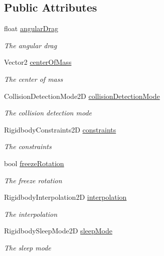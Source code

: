 \subsection*{Public Attributes}
\begin{DoxyCompactItemize}
\item 
float \hyperlink{class_serialize_rigid_body2_d_1_1_rigid_body_info_a3f9bedb62fcbba4aaf6b9cfa2e3b0312}{angular\+Drag}
\begin{DoxyCompactList}\small\item\em The angular drag \end{DoxyCompactList}\item 
Vector2 \hyperlink{class_serialize_rigid_body2_d_1_1_rigid_body_info_a2d7ee56387ef715efaea212b3ebafdd2}{center\+Of\+Mass}
\begin{DoxyCompactList}\small\item\em The center of mass \end{DoxyCompactList}\item 
Collision\+Detection\+Mode2D \hyperlink{class_serialize_rigid_body2_d_1_1_rigid_body_info_a7e7fd47e14d4ba88984b267519a0edd3}{collision\+Detection\+Mode}
\begin{DoxyCompactList}\small\item\em The collision detection mode \end{DoxyCompactList}\item 
Rigidbody\+Constraints2D \hyperlink{class_serialize_rigid_body2_d_1_1_rigid_body_info_a6f74e2ed03d785da45b9fd297ab0bf3b}{constraints}
\begin{DoxyCompactList}\small\item\em The constraints \end{DoxyCompactList}\item 
bool \hyperlink{class_serialize_rigid_body2_d_1_1_rigid_body_info_abf143205ce2eae0445bc2450f0335949}{freeze\+Rotation}
\begin{DoxyCompactList}\small\item\em The freeze rotation \end{DoxyCompactList}\item 
Rigidbody\+Interpolation2D \hyperlink{class_serialize_rigid_body2_d_1_1_rigid_body_info_a6851bc1fa6864eeedb06ae0235cfd07b}{interpolation}
\begin{DoxyCompactList}\small\item\em The interpolation \end{DoxyCompactList}\item 
Rigidbody\+Sleep\+Mode2D \hyperlink{class_serialize_rigid_body2_d_1_1_rigid_body_info_a193e813093d8d6d0c8c869748b3bddb7}{sleep\+Mode}
\begin{DoxyCompactList}\small\item\em The sleep mode \end{DoxyCompactList}\end{DoxyCompactItemize}


